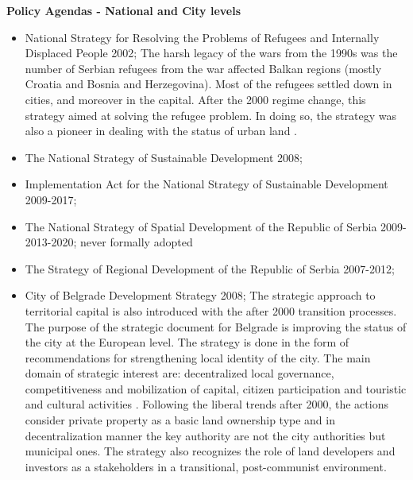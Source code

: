 \documentclass[11pt]{report}
\begin{document}
\textbf{Policy Agendas - National and City levels}

\begin{itemize}
\item National Strategy for Resolving the Problems of Refugees and Internally Displaced People 2002;
The harsh legacy of the wars from the 1990s was the number of Serbian refugees from the war affected Balkan regions (mostly Croatia and Bosnia and Herzegovina). Most of the refugees settled down in cities, and moreover in the capital. After the 2000 regime change, this strategy aimed at solving the refugee problem. In doing so, the strategy was also a pioneer in dealing with the status of urban land \cite{(Hirt 2009)}.
\item The National Strategy of Sustainable Development 2008;
\item Implementation Act for the National Strategy of Sustainable Development 2009-2017;
\item The National Strategy of Spatial Development of the Republic of Serbia 2009-2013-2020;
never formally adopted
\item The Strategy of Regional Development of the Republic of Serbia 2007-2012;
\item City of Belgrade Development Strategy 2008;
The strategic approach to territorial capital is also introduced with the after 2000 transition processes. The purpose of the strategic document for Belgrade is improving the status of the city at the European level\footnotemark \cite{nedovic budic 2001}. The strategy is done in the form of recommendations for strengthening local identity of the city. The main domain of strategic interest are: decentralized local governance, competitiveness and mobilization of capital, citizen participation and touristic and cultural activities \cite{Vukmirovic in Doytchinov et al 2015}. Following the liberal trends after 2000, the actions consider private property as a basic land ownership type and in decentralization manner the key authority are not the city authorities but municipal ones. The strategy also recognizes the role of land developers and investors as a stakeholders in a transitional, post-communist environment.
\end{itemize}
\end{document}
